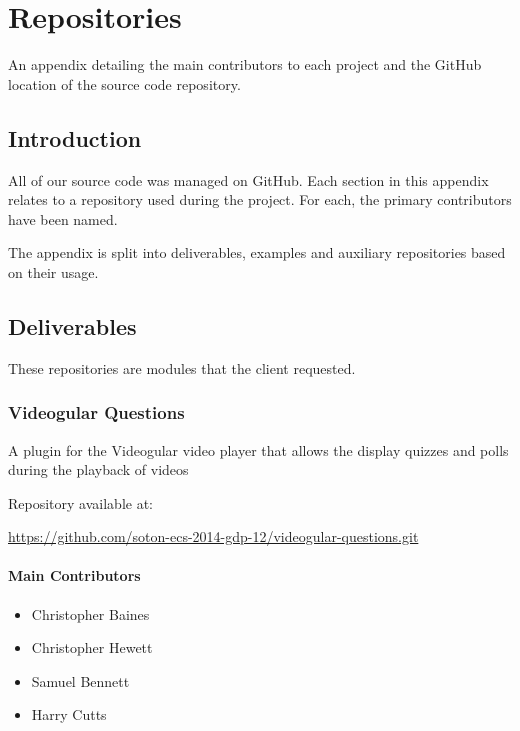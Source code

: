 \chapter{Repositories} \label{App:Repositories}

\begin{preamble}
An appendix detailing the main contributors to each project and the GitHub location of the source code repository.
\end{preamble}

\section{Introduction}

All of our source code was managed on GitHub. Each section in this appendix relates to a repository used during the project. For each, the primary contributors have been named.

The appendix is split into deliverables, examples and auxiliary repositories based on their usage.

\section{Deliverables}

These repositories are modules that the client requested.

\subsection{Videogular Questions}
\label{Section:Repo_videogular_questions}

A plugin for the \gls{Videogular} video player that allows the display quizzes and polls during the playback of videos

Repository available at:

\url{https://github.com/soton-ecs-2014-gdp-12/videogular-questions.git}

\subsubsection{Main Contributors}
\begin{itemize}
  \item Christopher Baines
  \item Christopher Hewett
  \item Samuel Bennett
  \item Harry Cutts
\end{itemize}

